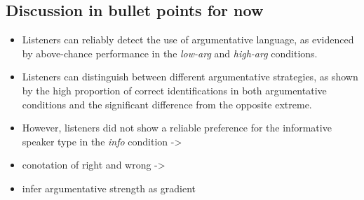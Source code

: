 \documentclass[11pt]{article}
\begin{document}
\subsection{Discussion in bullet points for now}
\begin{itemize}
	\item Listeners can reliably detect the use of argumentative language, as evidenced by above-chance performance in the \emph{low-arg} and \emph{high-arg} conditions.
	\item Listeners can distinguish between different argumentative strategies, as shown by the high proportion of correct identifications in both argumentative conditions and the significant difference from the opposite extreme.
	\item However, listeners did not show a reliable preference for the informative speaker type in the \emph{info} condition -> 
	\item conotation of right and wrong -> 
	\item infer argumentative strength as gradient 
\end{itemize}

\newpage


\end{document}
